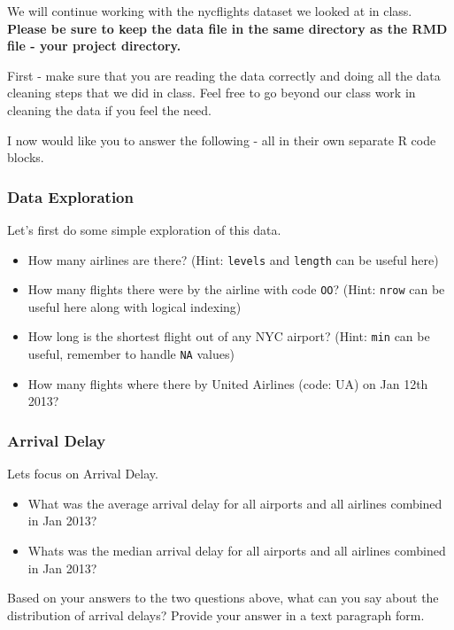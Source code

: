 \documentclass[
]{article}
\begin{document}
We will continue working with the nycflights dataset we looked at in
class. \textbf{Please be sure to keep the data file in the same
directory as the RMD file - your project directory.}

First - make sure that you are reading the data correctly and doing all
the data cleaning steps that we did in class. Feel free to go beyond our
class work in cleaning the data if you feel the need.

I now would like you to answer the following - all in their own separate
R code blocks.

\hypertarget{data-exploration}{%
\subsubsection{Data Exploration}\label{data-exploration}}

Let's first do some simple exploration of this data.

\begin{itemize}
\item
  How many airlines are there? (Hint: \texttt{levels} and
  \texttt{length} can be useful here)
\item
  How many flights there were by the airline with code \texttt{OO}?
  (Hint: \texttt{nrow} can be useful here along with logical indexing)
\item
  How long is the shortest flight out of any NYC airport? (Hint:
  \texttt{min} can be useful, remember to handle \texttt{NA} values)
\item
  How many flights where there by United Airlines (code: UA) on Jan 12th
  2013?
\end{itemize}

\hypertarget{arrival-delay}{%
\subsubsection{Arrival Delay}\label{arrival-delay}}

Lets focus on Arrival Delay.

\begin{itemize}
\item
  What was the average arrival delay for all airports and all airlines
  combined in Jan 2013?
\item
  Whats was the median arrival delay for all airports and all airlines
  combined in Jan 2013?
\end{itemize}

Based on your answers to the two questions above, what can you say about
the distribution of arrival delays? Provide your answer in a text
paragraph form.
\end{document}
